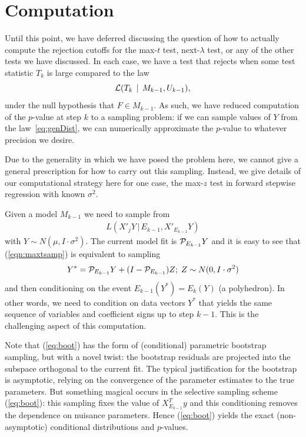 \documentclass{article}
\begin{document}
\section{Computation}
\label{sec:computation}

Until this point, we have deferred discussing the question of how to actually compute the rejection cutoffs for the max-$t$ test, next-$\lambda$ test, or any of the other tests we have discussed. In each case, we have a test that rejects when some test statistic $T_k$ is large compared to the law
\begin{equation}\label{eq:genDist}
\mathcal{L}(T_k \,\mid\, M_{k-1}, U_{k-1}),
\end{equation}
under the null hypothesis that $F\in M_{k-1}$. As such, we have reduced computation of the $p$-value at step $k$ to a sampling problem: if we can sample values of $Y$ from the law~\eqref{eq:genDist}, we can numerically approximate the $p$-value to whatever precision we desire.

Due to the generality in which we have posed the problem here, we cannot give a general prescription for how to carry out this sampling. Instead, we give details of our computational strategy here for one case, the max-$z$ test in forward stepwise regression with known $\sigma^2$.

Given a model $M_{k-1}$   we need to sample from 
\begin{eqnarray}
L(X'_jY \,|\, E_{k-1},X'_{E_{k-1}}Y)
\label{eqn:maxtsamp}
\end{eqnarray}
with $Y\sim N(\mu, I \cdot \sigma^2)$.
The current model fit is $\mathcal{P}_{E_{k-1}} Y$ and it is easy to see that (\ref{eqn:maxtsamp})  is equivalent to sampling
\begin{eqnarray}
Y^*=\mathcal{P}_{E_{k-1}} Y + (I- \mathcal{P}_{E_{k-1}}) Z; \;Z\sim N(0,I\cdot\sigma^2)
\label{eq:boot}
\end{eqnarray}
and then conditioning on the event $E_{k-1}(Y^*)= E_k(Y)$ (a polyhedron).
In other words, we need to condition on data vectors  $Y^*$ that yields the same
sequence of variables and coefficient signs up to step $k-1$. This is the challenging aspect of this computation.


Note that  (\ref{eq:boot})  has the form of  (conditional) parametric bootstrap sampling, but  with  a novel twist:  the bootstrap residuals are projected into the subspace
orthogonal to the current fit.  The typical justification for the bootstrap is asymptotic, relying on the convergence of the parameter estimates to the true parameters.
But something magical  occurs in the selective sampling scheme (\ref{eq:boot}): this  sampling fixes the value of $ X_{E_{k-1}}^Ty$ and this conditioning
removes the dependence on nuisance parameters.
Hence  (\ref{eq:boot}) yields the exact (non-asymptotic) conditional distributions and $p$-values.
\end{document}
